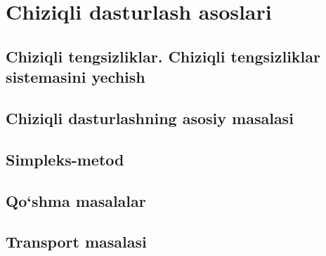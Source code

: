 \chapter{Chiziqli dasturlash asoslari}
\section{Chiziqli tengsizliklar. Chiziqli tengsizliklar sistemasini yechish}
\section{Chiziqli dasturlashning asosiy masalasi}
\section{Simpleks-metod}
\section{Qo`shma masalalar}
\section{Transport masalasi}
